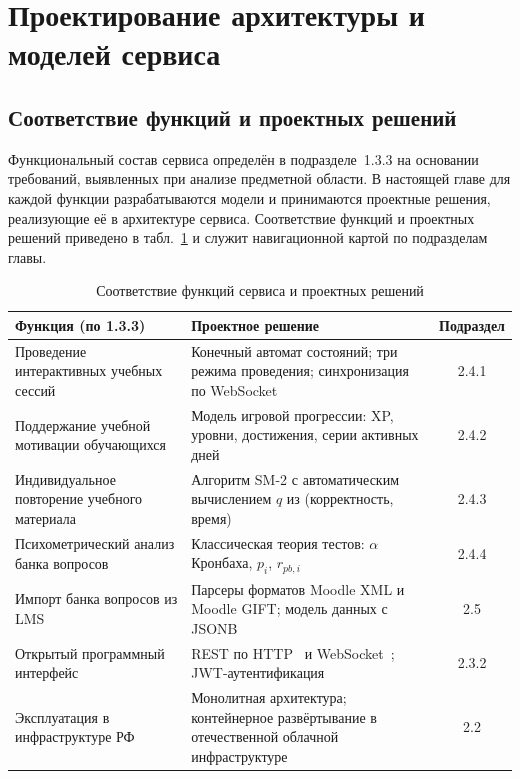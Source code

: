 \section[ПРОЕКТИРОВАНИЕ АРХИТЕКТУРЫ И МОДЕЛЕЙ СЕРВИСА]{Проектирование архитектуры и моделей сервиса}
\thispagestyle{plain}

\subsection{Соответствие функций и проектных решений}

Функциональный состав сервиса определён в подразделе~1.3.3 на основании
требований, выявленных при анализе предметной области. В настоящей
главе для каждой функции разрабатываются модели и принимаются
проектные решения, реализующие её в архитектуре сервиса. Соответствие
функций и проектных решений приведено в табл.~\ref{tab:functions-design}
и служит навигационной картой по подразделам главы.

\begin{table}[!htb]
\fontsize{11pt}{13pt}\selectfont
\centering
\caption{Соответствие функций сервиса и проектных решений}
\label{tab:functions-design}
\smallskip
\begin{tabular}{|p{4.7cm}|p{6.2cm}|c|}
    \hline
    \textbf{Функция (по 1.3.3)} & \textbf{Проектное решение} & \textbf{Подраздел} \\
    \hline
        Проведение интерактивных учебных сессий
            & Конечный автомат состояний; три режима проведения; синхронизация по WebSocket
            & 2.4.1 \\
    \hline
        Поддержание учебной мотивации обучающихся
            & Модель игровой прогрессии: XP, уровни, достижения, серии активных дней
            & 2.4.2 \\
    \hline
        Индивидуальное повторение учебного материала
            & Алгоритм SM-2 с автоматическим вычислением $q$ из (корректность, время)
            & 2.4.3 \\
    \hline
        Психометрический анализ банка вопросов
            & Классическая теория тестов: $\alpha$ Кронбаха, $p_i$, $r_{pb,i}$
            & 2.4.4 \\
    \hline
        Импорт банка вопросов из LMS
            & Парсеры форматов Moodle XML и Moodle GIFT; модель данных с JSONB
            & 2.5 \\
    \hline
        Открытый программный интерфейс
            & REST по HTTP~\cite{rfc9110} и WebSocket~\cite{rfc6455}; JWT-аутентификация
            & 2.3.2 \\
    \hline
        Эксплуатация в инфраструктуре РФ
            & Монолитная архитектура; контейнерное развёртывание в отечественной облачной инфраструктуре~\cite{fz152}
            & 2.2 \\
    \hline
\end{tabular}
\end{table}
\FloatBarrier

